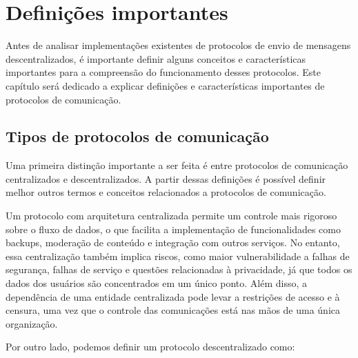
\chapter{Definições importantes}

Antes de analisar implementações existentes de protocolos de envio de mensagens descentralizados, é importante definir alguns conceitos e características importantes para a compreensão do funcionamento desses protocolos. Este capítulo será dedicado a explicar definições e características importantes de protocolos de comunicação.

\section{Tipos de protocolos de comunicação}

Uma primeira distinção importante a ser feita é entre protocolos de comunicação centralizados e descentralizados. A partir dessas definições é possível definir melhor outros termos e conceitos relacionados a protocolos de comunicação.


Um protocolo com arquitetura centralizada permite um controle mais rigoroso sobre o fluxo de dados, o que facilita a implementação de funcionalidades como backups, moderação de conteúdo e integração com outros serviços. No entanto, essa centralização também implica riscos, como maior vulnerabilidade a falhas de segurança, falhas de serviço e questões relacionadas à privacidade, já que todos os dados dos usuários são concentrados em um único ponto. Além disso, a dependência de uma entidade centralizada pode levar a restrições de acesso e à censura, uma vez que o controle das comunicações está nas mãos de uma única organização.

Por outro lado, podemos definir um protocolo descentralizado como:

